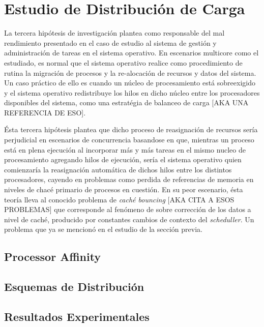 \section{Estudio de Distribución de Carga}
La tercera hipótesis de investigación plantea como responsable del mal rendimiento presentado en el caso de estudio al sistema de gestión y administración de tareas en el sistema operativo. En escenarios multicore como el estudiado, es normal que el sistema operativo realice como procedimiento de rutina la migración de procesos y la re-alocación de recursos y datos del sistema. Un caso práctico de ello es cuando un núcleo de procesamiento está sobreexigido y el sistema operativo redistribuye los hilos en dicho núcleo entre los procesadores disponibles del sistema, como una estratégia de balanceo de carga [AKA UNA REFERENCIA DE ESO].

Ésta tercera hipótesis plantea que dicho proceso de reasignación de recursos sería perjudicial en escenarios de concurrencia basandose en que, mientras un proceso está en plena ejecución al incorporar más y más tareas en el mismo nucleo de procesamiento agregando hilos de ejecución, sería el sistema operativo quien comienzaría la reasignación automática de dichos hilos entre los distintos procesadores, cayendo en problemas como perdida de referencias de memoria en niveles de chacé primario de procesos en cuestión. En su peor escenario, ésta teoría lleva al conocido problema de \emph{caché bouncing} [AKA CITA A ESOS PROBLEMAS] que corresponde al fenómeno de sobre corrección de los datos a nivel de caché, producido por constantes cambios de contexto del \emph{scheduller}. Un problema que ya se mencionó en el estudio de la sección previa.

\subsection{Processor Affinity}
\subsection{Esquemas de Distribución}
\subsection{Resultados Experimentales}